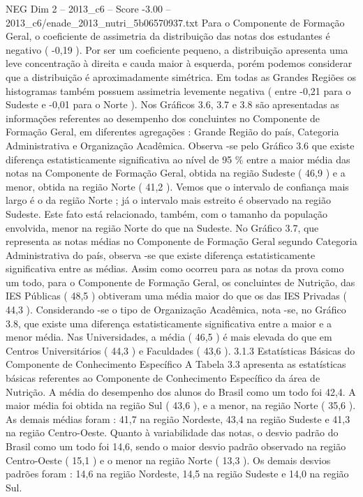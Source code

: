 \begin{textsample}{NEG Dim 2 – 2013\_c6 – Score -3.00 – 2013\_c6/enade\_2013\_nutri\_5b06570937.txt}
Para o Componente de Formação Geral, o coeficiente de assimetria da distribuição das notas dos estudantes é negativo ( -0,19 ).
Por ser um coeficiente pequeno, a distribuição apresenta uma leve concentração à direita e cauda maior à esquerda, porém podemos considerar que a distribuição é aproximadamente simétrica.
Em todas as Grandes Regiões os histogramas também possuem assimetria levemente negativa ( entre -0,21 para o Sudeste e -0,01 para o Norte ).
Nos Gráficos 3.6, 3.7 e 3.8 são apresentadas as informações referentes ao desempenho dos concluintes no Componente de Formação Geral, em diferentes agregações : Grande Região do país, Categoria Administrativa e Organização Acadêmica.
Observa -se pelo Gráfico 3.6 que existe diferença estatisticamente significativa ao nível de 95 \% entre a maior média das notas na Componente de Formação Geral, obtida na região Sudeste ( 46,9 ) e a menor, obtida na região Norte ( 41,2 ).
Vemos que o intervalo de confiança mais largo é o da região Norte ; já o intervalo mais estreito é observado na região Sudeste.
Este fato está relacionado, também, com o tamanho da população envolvida, menor na região Norte do que na Sudeste.
No Gráfico 3.7, que representa as notas médias no Componente de Formação Geral segundo Categoria Administrativa do país, observa -se que existe diferença estatisticamente significativa entre as médias.
Assim como ocorreu para as notas da prova como um todo, para o Componente de Formação Geral, os concluintes de Nutrição, das IES Públicas ( 48,5 ) obtiveram uma média maior do que os das IES Privadas ( 44,3 ).
Considerando -se o tipo de Organização Acadêmica, nota -se, no Gráfico 3.8, que existe uma diferença estatisticamente significativa entre a maior e a menor média.
Nas Universidades, a média ( 46,5 ) é mais elevada do que em Centros Universitários ( 44,3 ) e Faculdades ( 43,6 ). 3.1.3 Estatísticas Básicas do Componente de Conhecimento Específico A Tabela 3.3 apresenta as estatísticas básicas referentes ao Componente de Conhecimento Específico da área de Nutrição.
A média do desempenho dos alunos do Brasil como um todo foi 42,4.
A maior média foi obtida na região Sul ( 43,6 ), e a menor, na região Norte ( 35,6 ).
As demais médias foram : 41,7 na região Nordeste, 43,4 na região Sudeste e 41,3 na região Centro-Oeste.
Quanto à variabilidade das notas, o desvio padrão do Brasil como um todo foi 14,6, sendo o maior desvio padrão observado na região Centro-Oeste ( 15,1 ) e o menor na região Norte ( 13,3 ).
Os demais desvios padrões foram : 14,6 na região Nordeste, 14,5 na região Sudeste e 14,0 na região Sul.

\end{textsample}

